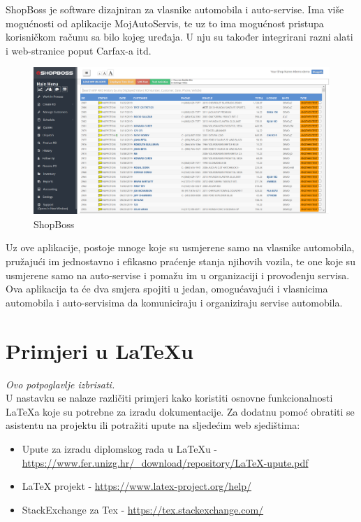 		ShopBoss je software dizajniran za vlasnike automobila i auto-servise. Ima više mogućnosti od aplikacije MojAutoServis, te uz to ima mogućnost pristupa korisničkom računu sa bilo kojeg uređaja. U nju su također integrirani razni alati i web-stranice poput Carfax-a itd.
		
		\begin{figure}[H]
			\includegraphics[scale=0.3]{slike/shopboss.PNG}
			\centering
			\caption{ShopBoss}
			\label{fig:idk1}
		\end{figure}
		
		Uz ove aplikacije, postoje mnoge koje su usmjerene samo na vlasnike automobila, pružajući im jednostavno i efikasno praćenje stanja njihovih vozila, te one koje su usmjerene samo na auto-servise i pomažu im u organizaciji i provođenju servisa. Ova aplikacija ta će dva smjera spojiti u jedan, omogućavajući i vlasnicima automobila i auto-servisima da komuniciraju i organiziraju servise automobila.\\
		
		\eject
		
		\section{Primjeri u LaTeXu}
		
		\textit{Ovo potpoglavlje izbrisati.}\\

		U nastavku se nalaze različiti primjeri kako koristiti osnovne funkcionalnosti LaTeXa koje su potrebne za izradu dokumentacije. Za dodatnu pomoć obratiti se asistentu na projektu ili potražiti upute na sljedećim web sjedištima:
		\begin{itemize}
			\item Upute za izradu diplomskog rada u LaTeXu - \url{https://www.fer.unizg.hr/_download/repository/LaTeX-upute.pdf}
			\item LaTeX projekt - \url{https://www.latex-project.org/help/}
			\item StackExchange za Tex - \url{https://tex.stackexchange.com/}\\
		
		\end{itemize} 	


